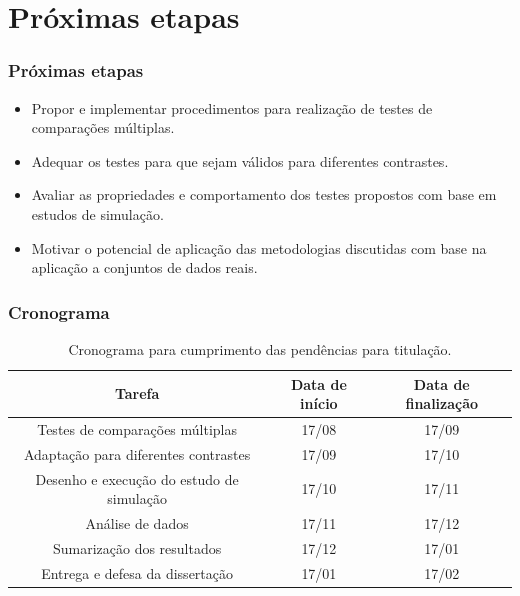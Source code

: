 \documentclass[10pt,
  aspectratio=169,
  serif,
  mathserif,
  professionalfont,
  compress,
  handout,
  ]{beamer}\usepackage[]{graphicx}\usepackage[]{color}
\begin{document}

\section{Próximas etapas}


\begin{frame}
  \frametitle{Próximas etapas}
 
\begin{itemize}
\itemsep 2ex

  \item Propor e implementar procedimentos para realização de testes de comparações múltiplas.
  
  \item Adequar os testes para que sejam válidos para diferentes contrastes. 
  
  \item Avaliar as propriedades e comportamento dos testes propostos com base em estudos de simulação.
  
  \item Motivar o potencial de aplicação das metodologias discutidas com base na aplicação a conjuntos de dados reais.
  
\end{itemize}

\end{frame}


\begin{frame}
  \frametitle{Cronograma}
 
\begin{table}[H]
\centering
\begin{tabular}{ccc}
\hline
\textbf{Tarefa}                                   & \textbf{Data de início} & \textbf{Data de finalização} \\ \hline
Testes de comparações múltiplas & 17/08                   & 17/09                        \\
Adaptação para diferentes contrastes  & 17/09                   & 17/10                        \\
Desenho e execução do estudo de simulação         & 17/10                   & 17/11                        \\
Análise de dados                                  & 17/11                   & 17/12                        \\
Sumarização dos resultados                        & 17/12                   & 17/01                        \\
Entrega e defesa da dissertação                   & 17/01                   & 17/02                        \\ \hline
\end{tabular}
\caption{Cronograma para cumprimento das pendências para titulação.}
\label{tab:crono}
\end{table}

\end{frame}
\end{document}
